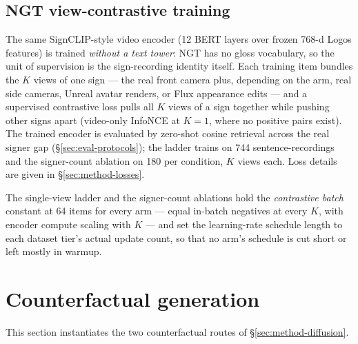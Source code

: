 \subsection{NGT view-contrastive training}
The same SignCLIP-style
video encoder (12 BERT layers over frozen 768-d Logos features) is
trained \emph{without a text tower}: NGT has no gloss vocabulary, so the
unit of supervision is the sign-recording identity itself. Each training
item bundles the $K$ views of one sign --- the real front camera plus,
depending on the arm, real side cameras, Unreal avatar renders, or Flux
appearance edits --- and a supervised contrastive loss pulls all $K$
views of a sign together while pushing other signs apart (video-only
InfoNCE at $K{=}1$, where no positive pairs exist). The trained encoder
is evaluated by zero-shot cosine retrieval across the real signer gap
(\S\ref{sec:eval-protocols}); the ladder trains on 744
sentence-recordings and the signer-count ablation on 180 per condition,
$K$ views each. Loss details are given in \S\ref{sec:method-losses}.

The single-view ladder and the signer-count ablations hold the
\emph{contrastive batch} constant at 64 items for every arm ---
equal in-batch negatives at every $K$, with encoder compute scaling
with $K$ --- and set the learning-rate schedule length to each
dataset tier's actual update count, so that no arm's schedule is cut
short or left mostly in warmup.


\section{Counterfactual generation}
\label{sec:setup-generation}
This section instantiates the two counterfactual routes of
\S\ref{sec:method-diffusion}.

